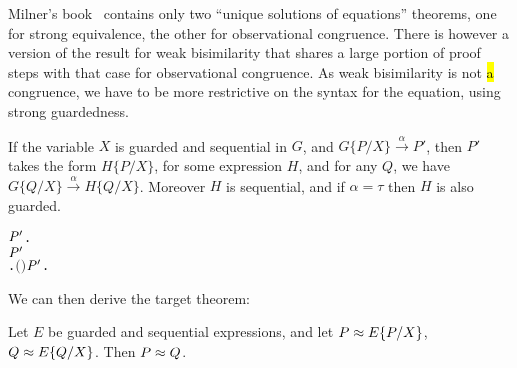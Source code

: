 Milner's book~\cite{Mil89} contains only two ``unique solutions of
equations'' theorems, one for strong equivalence, the other for
observational congruence.   There is however a
version  of the result for weak bisimilarity that shares a large portion of proof
steps with that case for observational congruence.  
As  weak bisimilarity 
 is not \hl{a} congruence, we have to be more restrictive on the syntax for
 the equation, using strong guardedness.
\begin{lemma}
If the variable $X$ is guarded and sequential in $G$, and
$G\{P/X\}\overset{\alpha}{\rightarrow} P'$, then $P'$ takes the form
$H\{P/X\}$, for some expression $H$, and for any $Q$, we have
$G\{Q/X\}\overset{\alpha}{\rightarrow} H\{Q/X\}$. Moreover $H$ is
sequential, and if $\alpha = \tau$ then $H$ is also guarded.
\begin{alltt}
\HOLTokenTurnstile{}   \HOLSymConst{\HOLTokenConj{}}   \HOLSymConst{\HOLTokenImp{}}
   \HOLSymConst{\HOLTokenForall{}}  \ensuremath{\HOLBoundVar{P}\sp{\prime}}.
         \HOLTokenTransBegin{}\HOLTokenTransEnd \ensuremath{\HOLBoundVar{P}\sp{\prime}} \HOLSymConst{\HOLTokenImp{}}
       \HOLSymConst{\HOLTokenExists{}}.   \HOLSymConst{\HOLTokenConj{}} \ensuremath{(} \HOLSymConst{\ensuremath{=}} \HOLSymConst{\ensuremath{\tau}} \HOLSymConst{\HOLTokenImp{}}  \ensuremath{)} \HOLSymConst{\HOLTokenConj{}} \ensuremath{\HOLBoundVar{P}\sp{\prime}} \HOLSymConst{\ensuremath{=}}   \HOLSymConst{\HOLTokenConj{}} \HOLSymConst{\HOLTokenForall{}}.   \HOLTokenTransBegin{}\HOLTokenTransEnd {} 
\end{alltt}
\end{lemma}

We can then derive the target theorem:
\begin{theorem}
Let $E$ be guarded and sequential expressions, and let $P \approx
E\{P/X\}$,
$Q \approx E\{Q/X\}$. Then $P \approx Q$.
\begin{alltt}
\HOLTokenTurnstile{}   \HOLSymConst{\HOLTokenConj{}}   \HOLSymConst{\HOLTokenConj{}}  \HOLSymConst{\HOLTokenWeakEQ}   \HOLSymConst{\HOLTokenConj{}}  \HOLSymConst{\HOLTokenWeakEQ}   \HOLSymConst{\HOLTokenImp{}}  \HOLSymConst{\HOLTokenWeakEQ} 
\end{alltt}
\end{theorem}

